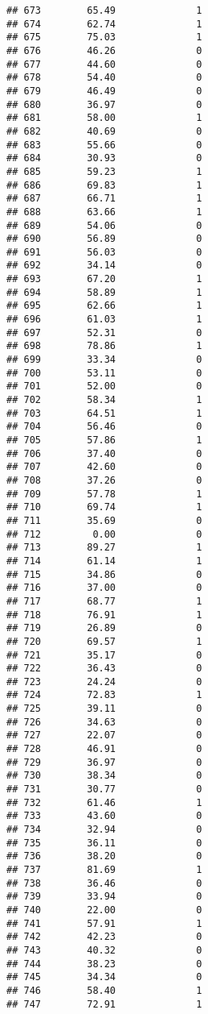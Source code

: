 \documentclass[
]{article}
\begin{document}
\begin{verbatim}
## 673        65.49              1
## 674        62.74              1
## 675        75.03              1
## 676        46.26              0
## 677        44.60              0
## 678        54.40              0
## 679        46.49              0
## 680        36.97              0
## 681        58.00              1
## 682        40.69              0
## 683        55.66              0
## 684        30.93              0
## 685        59.23              1
## 686        69.83              1
## 687        66.71              1
## 688        63.66              1
## 689        54.06              0
## 690        56.89              0
## 691        56.03              0
## 692        34.14              0
## 693        67.20              1
## 694        58.89              1
## 695        62.66              1
## 696        61.03              1
## 697        52.31              0
## 698        78.86              1
## 699        33.34              0
## 700        53.11              0
## 701        52.00              0
## 702        58.34              1
## 703        64.51              1
## 704        56.46              0
## 705        57.86              1
## 706        37.40              0
## 707        42.60              0
## 708        37.26              0
## 709        57.78              1
## 710        69.74              1
## 711        35.69              0
## 712         0.00              0
## 713        89.27              1
## 714        61.14              1
## 715        34.86              0
## 716        37.00              0
## 717        68.77              1
## 718        76.91              1
## 719        26.89              0
## 720        69.57              1
## 721        35.17              0
## 722        36.43              0
## 723        24.24              0
## 724        72.83              1
## 725        39.11              0
## 726        34.63              0
## 727        22.07              0
## 728        46.91              0
## 729        36.97              0
## 730        38.34              0
## 731        30.77              0
## 732        61.46              1
## 733        43.60              0
## 734        32.94              0
## 735        36.11              0
## 736        38.20              0
## 737        81.69              1
## 738        36.46              0
## 739        33.94              0
## 740        22.00              0
## 741        57.91              1
## 742        42.23              0
## 743        40.32              0
## 744        38.23              0
## 745        34.34              0
## 746        58.40              1
## 747        72.91              1

\end{verbatim}
\end{document}
